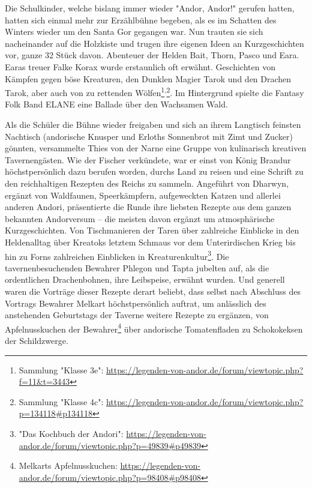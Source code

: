 Die Schulkinder, welche bislang immer wieder "Andor, Andor!" gerufen hatten, hatten sich einmal mehr zur Erzählbühne begeben, als es im Schatten des Winters wieder um den Santa Gor gegangen war. Nun trauten sie sich nacheinander auf die Holzkiste und trugen ihre eigenen Ideen an Kurzgeschichten vor, ganze 32 Stück davon. Abenteuer der Helden Bait, Thorn, Pasco und Eara. Earas treuer Falke Korax wurde erstaunlich oft erwähnt. Geschichten von Kämpfen gegen böse Kreaturen, den Dunklen Magier Tarok und den Drachen Tarok, aber auch von zu rettenden Wölfen\footnote{Sammlung "Klasse 3e": \url{https://legenden-von-andor.de/forum/viewtopic.php?f=11&t=3443}}\textsuperscript{,}\footnote{Sammlung "Klasse 4c": \url{https://legenden-von-andor.de/forum/viewtopic.php?p=134118\#p134118}}. Im Hintergrund spielte die Fantasy Folk Band ELANE eine Ballade über den Wachsamen Wald.

Als die Schüler die Bühne wieder freigaben und sich an ihrem Langtisch feinsten Nachtisch (andorische Knusper und Erloths Sonnenbrot mit Zimt und Zucker) gönnten, versammelte Thies von der Narne eine Gruppe von kulinarisch kreativen Tavernengästen. Wie der Fischer verkündete, war er einst von König Brandur höchstpersönlich dazu berufen worden, durchs Land zu reisen und eine Schrift zu den reichhaltigen Rezepten des Reichs zu sammeln. Angeführt von Dharwyn, ergänzt von Waldfaunen, Speerkämpfern, aufgeweckten Katzen und allerlei anderen Andori, präsentierte die Runde ihre liebsten Rezepte aus dem ganzen bekannten Andorversum  -- die meisten davon ergänzt um atmosphärische Kurzgeschichten. Von Tischmanieren der Taren über zahlreiche Einblicke in den Heldenalltag über Kreatoks letztem Schmaus vor dem Unterirdischen Krieg bis hin zu Forns zahlreichen Einblicken in Kreaturenkultur\footnote{"Das Kochbuch der Andori": \url{https://legenden-von-andor.de/forum/viewtopic.php?p=49839\#p49839}}. Die tavernenbesuchenden Bewahrer Phlegon und Tapta jubelten auf, als die ordentlichen Drachenbohnen, ihre Leibspeise, erwähnt wurden. Und generell waren die Vorträge dieser Rezepte derart beliebt, dass selbst nach Abschluss des Vortrags Bewahrer Melkart höchstpersönlich auftrat, um anlässlich des anstehenden Geburtstags der Taverne weitere Rezepte zu ergänzen, von Apfelnusskuchen der Bewahrer\footnote{Melkarts Apfelnusskuchen: \url{https://legenden-von-andor.de/forum/viewtopic.php?p=98408\#p98408}} über andorische Tomatenfladen zu Schokokeksen der Schildzwerge. 

